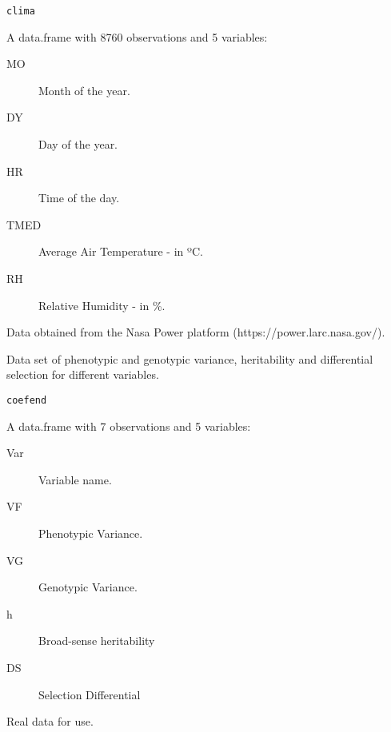 \documentclass[a4paper]{book}
\begin{document}
%
\begin{Usage}
\begin{verbatim}
clima
\end{verbatim}
\end{Usage}
%
\begin{Format}
A data.frame with 8760 observations and 5 variables:
\begin{description}

\item[MO] Month of the year.
\item[DY] Day of the year.
\item[HR] Time of the day.
\item[TMED] Average Air Temperature - in ºC.
\item[RH] Relative Humidity - in \%.

\end{description}

\end{Format}
%
\begin{Source}
Data obtained from the Nasa Power platform (https://power.larc.nasa.gov/).
\end{Source}
%
\begin{Description}
Data set of phenotypic and genotypic variance, heritability and
differential selection for different variables.
\end{Description}
%
\begin{Usage}
\begin{verbatim}
coefend
\end{verbatim}
\end{Usage}
%
\begin{Format}
A data.frame with 7 observations and 5 variables:
\begin{description}

\item[Var] Variable name.
\item[VF] Phenotypic Variance.
\item[VG] Genotypic Variance.
\item[h] Broad-sense heritability
\item[DS] Selection Differential

\end{description}

\end{Format}
%
\begin{Source}
Real data for use.
\end{Source}
\end{document}
